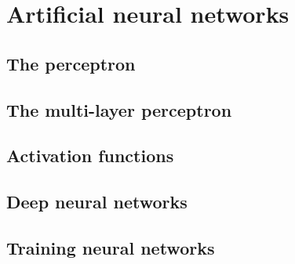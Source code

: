 \section{Artificial neural networks}
\subsection{The perceptron}
\subsection{The multi-layer perceptron}
\subsection{Activation functions}
\subsection{Deep neural networks}
\subsection{Training neural networks}
